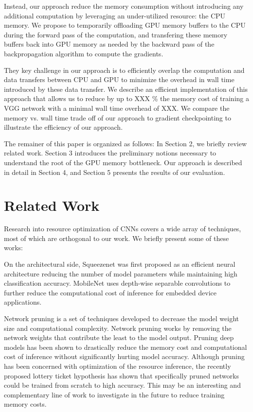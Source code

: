 \documentclass[11pt,onecolumn]{article}
\begin{document}
Instead, our approach reduce the memory consumption without introducing any additional
computation by leveraging an under-utilized resource: the CPU memory.
We propose to temporarily offloading GPU memory buffers to the CPU during the forward pass 
of the computation, and transfering these memory buffers back into GPU memory as needed by the 
backward pass of the backpropagation algorithm to compute the gradients.

They key challenge in our approach is to efficiently overlap the computation
and data transfers between CPU and GPU to minimize the overhead in wall time
introduced by these data transfer.
We describe an efficient implementation of this approach that allows us to reduce by
up to XXX \% the memory cost of training a VGG network with a minimal wall time overhead of XXX.
We compare the memory vs. wall time trade off of our approach to gradient checkpointing 
to illustrate the efficiency of our approach.

The remainer of this paper is organized as follows: In Section 2, we briefly review related work.
Section 3 introduces the preliminary notions necessary to understand the root of the GPU memory bottleneck.
Our approach is described in detail in Section 4, and Section 5 presents the results of our evaluation.

\section{Related Work}

Research into resource optimization of CNNs covers a wide array of techniques, 
most of which are orthogonal to our work. 
We briefly present some of these works:

On the architectural side, Squeezenet \cite{iandola2016squeezenet} 
was first proposed as an efficient neural architecture 
reducing the number of model parameters while maintaining high classification accuracy.
MobileNet \cite{howard2017mobilenets} uses depth-wise separable 
convolutions to further reduce the computational cost of inference for embedded device applications.

Network pruning \cite{molchanov2016pruning} is a set of techniques 
developed to decrease the model weight size and computational complexity.
Network pruning works by removing the network weights that contribute the least to the model output.
Pruning deep models has been shown to drastically reduce the memory 
cost and computational cost of inference without  significantly hurting model accuracy.
Although pruning has been concerned with optimization of the resource inference, 
the recently proposed lottery ticket hypothesis \cite{frankle2018lottery} 
has shown that specifically pruned networks could  be trained from scratch to high accuracy.
This may be an interesting and complementary line of work to investigate in the future to reduce training memory costs.
\end{document}

